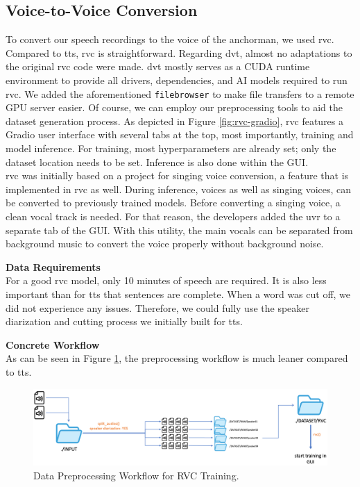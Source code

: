 \documentclass[
  a4paper,  %
  twoside,  %
  bibliography=totoc,
  headsepline,
  cleardoublepage=empty,
  parskip=half,
  draft=false
]{scrbook}
\begin{document}
\subsection{Voice-to-Voice Conversion}
To convert our speech recordings to the voice of the anchorman, we used \gls{rvc}. Compared to \gls{tts}, \gls{rvc} is straightforward. Regarding \gls*{dvt}, almost no adaptations to the original \gls*{rvc} \cite*{RVCProjectRetrievalbasedVoiceConversionWebUI2023} code were made. \gls*{dvt} mostly serves as a CUDA runtime environment to provide all drivers, dependencies, and AI models required to run \gls{rvc}. We added the aforementioned \verb|filebrowser| to make file transfers to a remote GPU server easier. Of course, we can employ our preprocessing tools to aid the dataset generation process. As depicted in Figure \ref{fig:rvc-gradio}, \gls{rvc} features a Gradio user interface with several tabs at the top, most importantly, training and model inference. For training, most hyperparameters are already set; only the dataset location needs to be set. Inference is also done within the GUI. \\
\gls{rvc} was initially based on a project for singing voice conversion, a feature that is implemented in \gls{rvc} as well. During inference, voices as well as singing voices, can be converted to previously trained models. Before converting a singing voice, a clean vocal track is needed. For that reason, the developers added the \gls{uvr} to a separate tab of the GUI. With this utility, the main vocals can be separated from background music to convert the voice properly without background noise.

\textbf{Data Requirements} \\
For a good \gls{rvc} model, only 10 minutes of speech are required. It is also less important than for \gls{tts} that sentences are complete. When a word was cut off, we did not experience any issues. Therefore, we could fully use the speaker diarization and cutting process we initially built for \gls{tts}. 

\textbf{Concrete Workflow} \\
As can be seen in Figure \ref{fig:rvc-wf}, the preprocessing workflow is much leaner compared to \gls{tts}.
\begin{figure}[h]

  \centering
  \includegraphics[width=1\textwidth]{./graphics/rvc/rvc-workflow.png}
  \caption{Data Preprocessing Workflow for RVC Training.}
  \label{fig:rvc-wf}
\end{figure}
\end{document}
